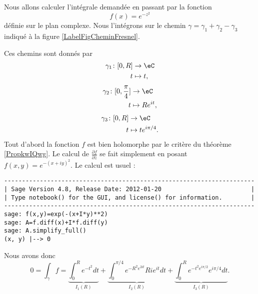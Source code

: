 Nous allons calculer l'intégrale demandée en passant par la fonction
\begin{equation}
    f(x)= e^{-z^2}
\end{equation}
définie sur le plan complexe. Nous l'intégrons sur le chemin \( \gamma=\gamma_1+\gamma_2-\gamma_3\) indiqué à la figure \ref{LabelFigCheminFresnel}.
\newcommand{\CaptionFigCheminFresnel}{Chemin d'intégration pour l'intégrale de Fresnel}

Ces chemins sont donnés par
\begin{equation}
    \begin{aligned}
        \gamma_1\colon \mathopen[ 0 , R \mathclose]&\to \eC \\
        t&\mapsto t, 
    \end{aligned}
\end{equation}
\begin{equation}
    \begin{aligned}
        \gamma_2\colon \mathopen[ 0 , \frac{ \pi }{ 4 } \mathclose]&\to \eC \\
        t&\mapsto R e^{it}, 
    \end{aligned}
\end{equation}
\begin{equation}
    \begin{aligned}
        \gamma_3\colon \mathopen[ 0 , R \mathclose]&\to \eC \\
        t&\mapsto t e^{i\pi/4}. 
    \end{aligned}
\end{equation}
Tout d'abord la fonction \( f\) est bien holomorphe par le critère du théorème \ref{PropkwIQwg}. Le calcul de \( \frac{ \partial f }{ \partial \bar z }\) se fait simplement en posant \( f(x,y)= e^{-(x+iy)^2}\). Le calcul est usuel :
\begin{verbatim}
----------------------------------------------------------------------
| Sage Version 4.8, Release Date: 2012-01-20                         |
| Type notebook() for the GUI, and license() for information.        |
----------------------------------------------------------------------
sage: f(x,y)=exp(-(x+I*y)**2)
sage: A=f.diff(x)+I*f.diff(y)
sage: A.simplify_full()
(x, y) |--> 0
\end{verbatim}
Nous avons donc
\begin{equation}    \label{EqfaoRgU}
    0=\int_{\gamma}f=\underbrace{\int_0^R e^{-t^2}dt}_{I_1(R)}+\underbrace{\int_0^{\pi/4} e^{-R^2 e^{2it}}Ri e^{it}dt}_{I_2(R)}+\underbrace{\int_0^R e^{-t^2 e^{i\pi/2}} e^{i\pi/4}dt}_{I_3(R)}.
\end{equation}
